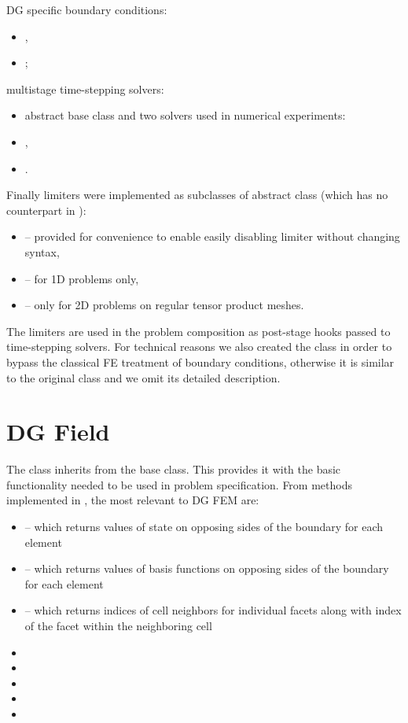 \noindent DG specific boundary conditions:
\begin{itemize}
    \item {},
    \item {};
\end{itemize}
multistage time-stepping solvers:
\begin{itemize}
    \item abstract base class  and two solvers used in numerical experiments:
    \item {},
    \item {}.
\end{itemize}
Finally limiters were implemented as subclasses of  abstract class (which has no
counterpart in \sfepy{}):
\begin{itemize}
    \item {} -- provided for convenience to enable
    easily disabling limiter without changing
    syntax,
    \item {} -- for 1D problems only,
    \item {} -- only for 2D problems on regular tensor
    product
    meshes.
\end{itemize}
The limiters are used in the problem composition as post-stage hooks passed to time-stepping solvers. For
technical reasons we also created the  class in order to bypass the classical FE
treatment of boundary conditions, otherwise it is similar to the original \sfepy{} 
class and we omit its detailed description.


\section{DG Field}
The  class inherits from the  base class. This provides it with the basic
functionality needed to be used in problem specification. From methods implemented in
, the most relevant to DG FEM are:
\begin{itemize}
    \item {} -- which returns values of state on opposing sides of
    the boundary for each element
    \item {} -- which returns values of basis functions on opposing
    sides of the boundary for each element
    \item {} -- which returns indices of cell neighbors for individual
    facets along with index of the facet within the neighboring cell
    \item {}
    \item {}
    \item {}
    \item {}
    \item {}
\end{itemize}

